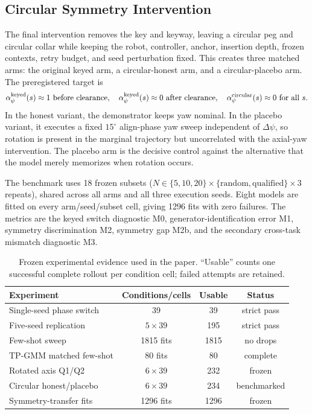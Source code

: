 \documentclass[letterpaper,10pt,conference]{ieeeconf}
\begin{document}
\subsection{Circular Symmetry Intervention}

The final intervention removes the key and keyway, leaving a circular
peg and circular collar while keeping the robot, controller, anchor, insertion
depth, frozen contexts, retry budget, and seed perturbation fixed. This creates
three matched arms: the original keyed arm, a circular-honest arm, and a
circular-placebo arm. The preregistered target is
\[
\alpha_\psi^{\rm keyed}(s)\approx 1 \ {\rm before\ clearance},\quad
\alpha_\psi^{\rm keyed}(s)\approx0 \ {\rm after\ clearance},\quad
\alpha_\psi^{\rm circular}(s)\approx0 \ {\rm for\ all}\ s.
\]
In the honest variant, the demonstrator keeps yaw nominal. In the placebo
variant, it executes a fixed $15^\circ$ align-phase yaw sweep independent of
$\Delta\psi$, so rotation is present in the marginal trajectory but
uncorrelated with the axial-yaw intervention. The placebo arm is the decisive
control against the alternative that the model merely memorizes when rotation
occurs.

The benchmark uses 18 frozen subsets
($N\in\{5,10,20\}\times\{\mathrm{random},\mathrm{qualified}\}\times3$
repeats), shared across all arms and all three execution seeds. Eight models
are fitted on every arm/seed/subset cell, giving 1296 fits with zero failures.
The metrics are the keyed switch diagnostic M0, generator-identification error
M1, symmetry discrimination M2, symmetry gap M2b, and the secondary cross-task
mismatch diagnostic M3.

\begin{table}[t]
\centering
\caption{Frozen experimental evidence used in the paper. ``Usable'' counts one
successful complete rollout per condition cell; failed attempts are retained.}
\label{tab:protocol}
\small
\setlength{\tabcolsep}{3.0pt}
\begin{tabular}{lccc}
\toprule
Experiment & Conditions/cells & Usable & Status\\
\midrule
Single-seed phase switch & 39 & 39 & strict pass\\
Five-seed replication & $5\times39$ & 195 & strict pass\\
Few-shot sweep & 1815 fits & 1815 & no drops\\
TP-GMM matched few-shot & 80 fits & 80 & complete\\
Rotated axis Q1/Q2 & $6\times39$ & 232 & frozen\\
Circular honest/placebo & $6\times39$ & 234 & benchmarked\\
Symmetry-transfer fits & 1296 fits & 1296 & frozen\\
\bottomrule
\end{tabular}
\end{table}
\end{document}
